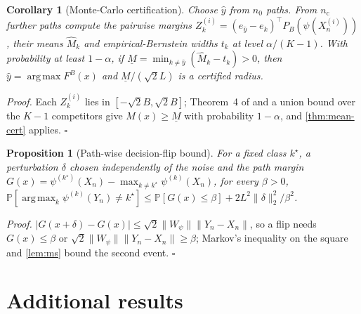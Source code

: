 \documentclass{article}
\newtheorem{proposition}{Proposition}
\newtheorem{corollary}{Corollary}
\theoremstyle{definition}
\newcommand{\Prob}{\mathbb{P}}
\newcommand{\tr}{\top}
\DeclareMathOperator*{\argmax}{arg\,max}
\begin{document}
\begin{corollary}[Monte-Carlo certification]\label{cor:mc}
Choose $\hat y$ from $n_0$ paths. From $n_{\mathrm c}$ further paths compute the
pairwise margins $Z^{(i)}_k=(e_{\hat y}-e_k)^\tr P_B(\psi(X^{(i)}_n))$, their
means $\hat M_k$ and empirical-Bernstein widths $t_k$ \citep{maurer2009bernstein}
at level $\alpha/(K-1)$. With probability at least $1-\alpha$, if
$\underline M=\min_{k\ne\hat y}(\hat M_k-t_k)>0$, then $\hat y=\argmax F^B(x)$ and
$\underline M/(\sqrt2L)$ is a certified radius.
\end{corollary}
\emph{Proof.} Each $Z^{(i)}_k$ lies in $[-\sqrt2B,\sqrt2B]$; Theorem~4 of
\citet{maurer2009bernstein} and a union bound over the $K-1$ competitors give
$M(x)\ge\underline M$ with probability $1-\alpha$, and \cref{thm:mean-cert}
applies. \hfill$\square$

\begin{proposition}[Path-wise decision-flip bound]\label{prop:flip}
For a fixed class $k^\star$, a perturbation $\delta$ chosen independently of the
noise and the path margin $G(x)=\psi^{(k^\star)}(X_n)-\max_{k\ne k^\star}\psi^{(k)}(X_n)$,
for every $\beta>0$,
$\Prob[\argmax_k\psi^{(k)}(Y_n)\ne k^\star]\le\Prob[G(x)\le\beta]+2L^2\|\delta\|_2^2/\beta^2$.
\end{proposition}
\emph{Proof.} $|G(x+\delta)-G(x)|\le\sqrt2\|W_\psi\|\|Y_n-X_n\|$, so a flip needs
$G(x)\le\beta$ or $\sqrt2\|W_\psi\|\|Y_n-X_n\|\ge\beta$; Markov's inequality on the
square and \cref{lem:ms} bound the second event. \hfill$\square$



\section{Additional results}\label{app:tables}
\end{document}
